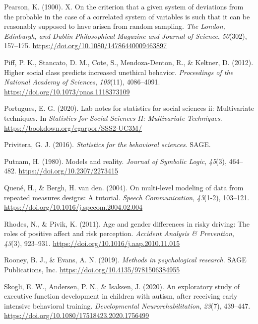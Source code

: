 \documentclass[
]{book}
\begin{document}
\leavevmode\hypertarget{ref-Pearson1900}{}%
Pearson, K. (1900). X. On the criterion that a given system of
deviations from the probable in the case of a correlated system of
variables is such that it can be reasonably supposed to have arisen from
random sampling. \emph{The London, Edinburgh, and Dublin Philosophical
Magazine and Journal of Science}, \emph{50}(302), 157--175.
\url{https://doi.org/10.1080/14786440009463897}

\leavevmode\hypertarget{ref-Piff2012}{}%
Piff, P. K., Stancato, D. M., Cote, S., Mendoza-Denton, R., \& Keltner,
D. (2012). Higher social class predicts increased unethical behavior.
\emph{Proceedings of the National Academy of Sciences}, \emph{109}(11),
4086--4091. \url{https://doi.org/10.1073/pnas.1118373109}

\leavevmode\hypertarget{ref-portugues2020}{}%
Portugues, E. G. (2020). Lab notes for statistics for social sciences
ii: Multivariate techniques. In \emph{Statistics for Social Sciences II:
Multivariate Techniques}. \url{https://bookdown.org/egarpor/SSS2-UC3M/}

\leavevmode\hypertarget{ref-privitera2016}{}%
Privitera, G. J. (2016). \emph{Statistics for the behavioral sciences}.
SAGE.

\leavevmode\hypertarget{ref-Putnam1980}{}%
Putnam, H. (1980). Models and reality. \emph{Journal of Symbolic Logic},
\emph{45}(3), 464--482. \url{https://doi.org/10.2307/2273415}

\leavevmode\hypertarget{ref-Quen2004}{}%
Quené, H., \& Bergh, H. van den. (2004). On multi-level modeling of data
from repeated measures designs: A tutorial. \emph{Speech Communication},
\emph{43}(1-2), 103--121.
\url{https://doi.org/10.1016/j.specom.2004.02.004}

\leavevmode\hypertarget{ref-Rhodes2011}{}%
Rhodes, N., \& Pivik, K. (2011). Age and gender differences in risky
driving: The roles of positive affect and risk perception.
\emph{Accident Analysis \& Prevention}, \emph{43}(3), 923--931.
\url{https://doi.org/10.1016/j.aap.2010.11.015}

\leavevmode\hypertarget{ref-Rooney2019}{}%
Rooney, B. J., \& Evans, A. N. (2019). \emph{Methods in psychological
research}. SAGE Publications, Inc.
\url{https://doi.org/10.4135/9781506384955}

\leavevmode\hypertarget{ref-Skogli2020}{}%
Skogli, E. W., Andersen, P. N., \& Isaksen, J. (2020). An exploratory
study of executive function development in children with autism, after
receiving early intensive behavioral training. \emph{Developmental
Neurorehabilitation}, \emph{23}(7), 439--447.
\url{https://doi.org/10.1080/17518423.2020.1756499}
\end{document}
